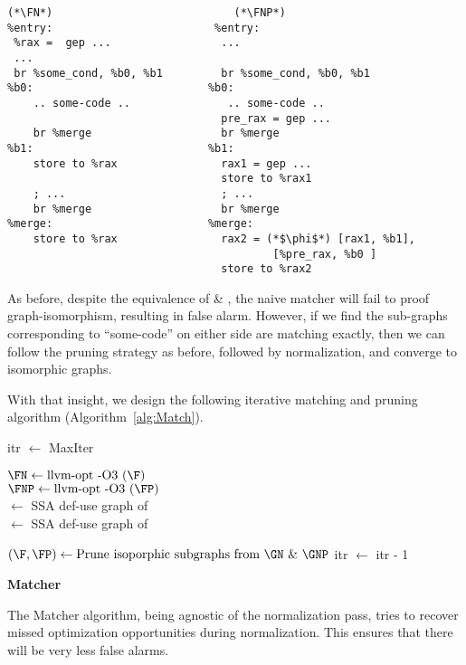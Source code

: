 \begin{lstlisting}[style=LLVMWOBORDER]
         (*\FN*)                            (*\FNP*)
%entry:                         %entry:
 %rax =  gep ...                 ...   
 ...
 br %some_cond, %b0, %b1         br %some_cond, %b0, %b1
%b0:                           %b0:
    .. some-code ..               .. some-code ..
                                 pre_rax = gep ...
    br %merge                    br %merge
%b1:                           %b1: 
    store to %rax                rax1 = gep ... 
                                 store to %rax1   
    ; ...                        ; ...
    br %merge                    br %merge
%merge:                        %merge: 
    store to %rax                rax2 = (*$\phi$*) [rax1, %b1], 
                                         [%pre_rax, %b0 ]
                                 store to %rax2
\end{lstlisting}
As before, despite the equivalence of \FN \& \FNP, the naive 
matcher will fail to proof graph-isomorphism, resulting in false alarm.
However, if we find the sub-graphs corresponding to ``some-code'' on either 
side are matching exactly, then we can follow  the pruning strategy as before, 
followed by normalization, and converge to isomorphic graphs.

With that insight, we design the following iterative matching and pruning 
algorithm (Algorithm~\ref{alg:Match}).  
\begin{algorithm}
    \BlankLine
        itr $\gets$ MaxIter \\
         {
            $\FN \gets \textup{llvm-opt -O3 } (\F)$ \\
            $\FNP \gets \textup{llvm-opt -O3 } (\FP)$ \\
            
            \GN $\gets$  SSA def-use graph of \FN \\
            \GNP $\gets$ SSA def-use graph of \FNP \\
            
             {
            }
            
            $(\F, \FP) \gets \textup{Prune isoporphic subgraphs from \GN \& 
            \GNP}$
            \BlankLine
            itr $\gets$ itr - 1 \\
        }
    \caption{\textbf{Matcher}}\label{alg:Match}
\end{algorithm}
The Matcher algorithm, being agnostic of the normalization pass, tries to 
recover missed optimization opportunities during normalization. This ensures 
that there will be very less false alarms.


